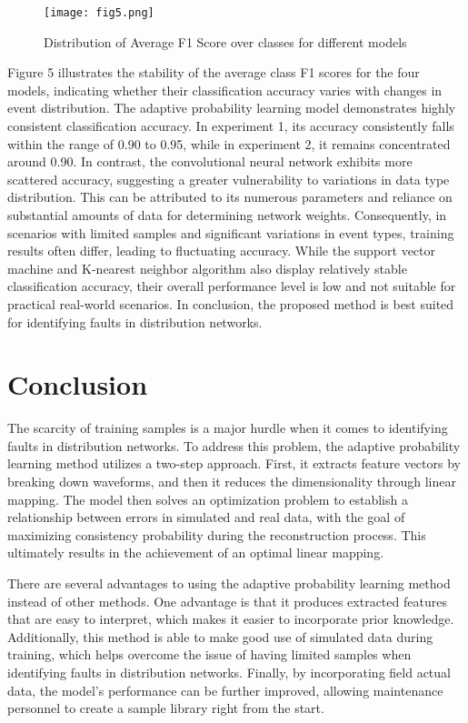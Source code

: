 \documentclass[conference]{IEEEtran}
\begin{document}
\begin{figure}[htbp]
\centerline{\texttt{[image: fig5.png]}}
\caption{Distribution of Average F1 Score over classes for different models}
\label{fig}
\end{figure}

Figure 5 illustrates the stability of the average class F1 scores \cite{krizhevsky2012imagenet} for the four models, indicating whether their classification accuracy varies with changes in event distribution. The adaptive probability learning model demonstrates highly consistent classification accuracy. In experiment 1, its accuracy consistently falls within the range of 0.90 to 0.95, while in experiment 2, it remains concentrated around 0.90. In contrast, the convolutional neural network exhibits more scattered accuracy, suggesting a greater vulnerability to variations in data type distribution. This can be attributed to its numerous parameters and reliance on substantial amounts of data for determining network weights. Consequently, in scenarios with limited samples and significant variations in event types, training results often differ, leading to fluctuating accuracy. While the support vector machine and K-nearest neighbor algorithm also display relatively stable classification accuracy, their overall performance level is low and not suitable for practical real-world scenarios. In conclusion, the proposed method is best suited for identifying faults in distribution networks.

\section{Conclusion}

The scarcity of training samples is a major hurdle when it comes to identifying faults in distribution networks. To address this problem, the adaptive probability learning method utilizes a two-step approach. First, it extracts feature vectors by breaking down waveforms, and then it reduces the dimensionality through linear mapping. The model then solves an optimization problem to establish a relationship between errors in simulated and real data, with the goal of maximizing consistency probability during the reconstruction process. This ultimately results in the achievement of an optimal linear mapping.

There are several advantages to using the adaptive probability learning method instead of other methods. One advantage is that it produces extracted features that are easy to interpret, which makes it easier to incorporate prior knowledge. Additionally, this method is able to make good use of simulated data during training, which helps overcome the issue of having limited samples when identifying faults in distribution networks. Finally, by incorporating field actual data, the model's performance can be further improved, allowing maintenance personnel to create a sample library right from the start.




\end{document}
